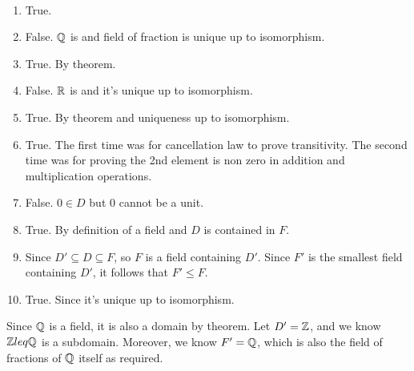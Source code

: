 \documentclass[12pt]{article}
\begin{document}
\begin{problem}[21.4]
~\begin{enumerate}[label=\alph*)]
	\item True. 
	\item False. $ \mathbb{Q}$ is and field of fraction is unique up to isomorphism. 
	\item True. By theorem.
	\item False. $ \mathbb{R}$ is and it's unique up to isomorphism.
	\item True. By theorem and uniqueness up to isomorphism.
	\item True. The first time was for cancellation law to prove transitivity. The second time was for proving the 2nd element is non zero in addition and multiplication operations.
	\item False. $ 0 \in D$ but $ 0$ cannot be a unit.
	\item True. By definition of a field and  $ D$ is contained in  $ F$.
	\item  Since $ D' \subseteq D \subseteq F$, so $ F$ is a field containing  $ D'$. Since  $ F'$ is the smallest field containing  $ D'$, it follows that $ F' \leq F$. 
	\item True. Since it's unique up to isomorphism.
\end{enumerate}
\end{problem}

\begin{problem}[21.5]
	Since $ \mathbb{Q}$ is a field, it is also a domain by theorem. Let $ D'=\mathbb{Z}$, and we know $ \mathbb{Z} leq \mathbb{Q}$ is a subdomain. Moreover, we know $ F'= \mathbb{Q}$, which is also the field of fractions of $ \mathbb{Q}$ itself as required.
\end{problem}
\end{document}
